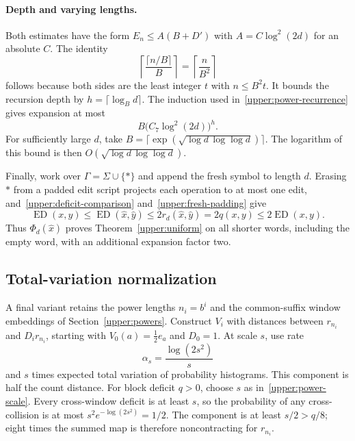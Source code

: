 \paragraph{Depth and varying lengths.}
Both estimates have the form $E_n\le A(B+D')$ with
$A=C\log^2(2d)$ for an absolute $C$. The identity
\begin{equation}\label{upper:ceiling-identity}
 \left\lceil\frac{\lceil n/B\rceil}{B}\right\rceil
 =\left\lceil\frac{n}{B^2}\right\rceil
\end{equation}
follows because both sides are the least integer $t$ with $n\le B^2t$.
It bounds the recursion depth by $h=\lceil\log_Bd\rceil$.
The induction used in~\eqref{upper:power-recurrence} gives expansion at most
\begin{equation}\label{upper:ceiling-recurrence}
 B\bigl(C_7\log^2(2d)\bigr)^h.
\end{equation}
For sufficiently large $d$, take
$B=\lceil\exp(\sqrt{\log d\,\log\log d})\rceil$. The logarithm
of this bound is then $O(\sqrt{\log d\,\log\log d})$.

Finally, work over $\Gamma=\Sigma\cup\{\ast\}$ and append the fresh symbol
to length $d$. Erasing $\ast$ from a padded edit script projects each
operation to at most one edit, and~\eqref{upper:deficit-comparison}
and~\eqref{upper:fresh-padding} give
\[
 \operatorname{ED}(x,y)\le\operatorname{ED}(\widehat x,\widehat y)
 \le2r_d(\widehat x,\widehat y)=2q(x,y)
 \le2\operatorname{ED}(x,y).
\]
Thus $\Phi_d(\widehat x)$ proves Theorem~\ref{upper:uniform} on all shorter
words, including the empty word, with an additional expansion factor two.

\subsection{Total-variation normalization}\label{upper:tv}

A final variant retains the power lengths $n_i=b^i$ and the common-suffix
window embeddings of Section~\ref{upper:powers}. Construct $V_i$ with
distances between $r_{n_i}$ and $D_i r_{n_i}$, starting with
$V_0(a)=\tfrac12e_a$ and $D_0=1$. At scale $s$, use rate
\begin{equation}\label{upper:tv-rate}
 \alpha_s=\frac{\log(2s^2)}s
\end{equation}
and $s$ times expected total variation of probability histograms.
This component is half the count distance. For block deficit $q>0$,
choose $s$ as in~\eqref{upper:power-scale}. Every cross-window deficit
is at least $s$, so the probability of any cross-collision is at most
$s^2e^{-\log(2s^2)}=1/2$. The component is at least $s/2>q/8$;
eight times the summed map is therefore noncontracting for $r_{n_i}$.


